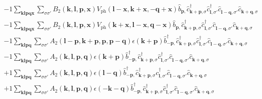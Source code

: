 \begin{align*}
	&-1 \sum_{ \mathbf{k} \mathbf{l} \mathbf{p} \mathbf{q} \mathbf{x} } \sum_{ \sigma \sigma' } B_2( \mathbf{k}, \mathbf{l}, \mathbf{p}, \mathbf{x} )  V_\mathrm{ph}( \mathbf{l}-\mathbf{x}, \mathbf{k}+\mathbf{x}, -\mathbf{q}+\mathbf{x} )   \hat{b}_{ \mathbf{p}, }^{\phantom{\dagger}} \hat{c}_{ \mathbf{k}+\mathbf{p}, \sigma }^\dagger  \hat{c}_{ \mathbf{l}, \sigma' }^\dagger  \hat{c}_{ \mathbf{l}-\mathbf{q}, \sigma' }^{\phantom{\dagger}} \hat{c}_{ \mathbf{k}+\mathbf{q}, \sigma }^{\phantom{\dagger}}  \\
	&-1 \sum_{ \mathbf{k} \mathbf{l} \mathbf{p} \mathbf{q} \mathbf{x} } \sum_{ \sigma \sigma' } B_2( \mathbf{k}, \mathbf{l}, \mathbf{p}, \mathbf{x} )  V_\mathrm{ph}( \mathbf{k}+\mathbf{x}, \mathbf{l}-\mathbf{x}, \mathbf{q}-\mathbf{x} )   \hat{b}_{ \mathbf{p}, }^{\phantom{\dagger}} \hat{c}_{ \mathbf{k}+\mathbf{p}, \sigma }^\dagger  \hat{c}_{ \mathbf{l}, \sigma' }^\dagger  \hat{c}_{ \mathbf{l}-\mathbf{q}, \sigma' }^{\phantom{\dagger}} \hat{c}_{ \mathbf{k}+\mathbf{q}, \sigma }^{\phantom{\dagger}}  \\
	&-1 \sum_{ \mathbf{k} \mathbf{l} \mathbf{p} \mathbf{q} } \sum_{ \sigma \sigma' } A_2( \mathbf{l}-\mathbf{p}, \mathbf{k}+\mathbf{p}, \mathbf{p}, \mathbf{p}-\mathbf{q} )  \epsilon( \mathbf{k}+\mathbf{p} )   \hat{b}_{ -\mathbf{p}, }^\dagger  \hat{c}_{ \mathbf{k}+\mathbf{p}, \sigma }^\dagger  \hat{c}_{ \mathbf{l}, \sigma' }^\dagger  \hat{c}_{ \mathbf{l}-\mathbf{q}, \sigma' }^{\phantom{\dagger}} \hat{c}_{ \mathbf{k}+\mathbf{q}, \sigma }^{\phantom{\dagger}}  \\
	&-1 \sum_{ \mathbf{k} \mathbf{l} \mathbf{p} \mathbf{q} } \sum_{ \sigma \sigma' } A_2( \mathbf{k}, \mathbf{l}, \mathbf{p}, \mathbf{q} )  \epsilon( \mathbf{k}+\mathbf{p} )   \hat{b}_{ -\mathbf{p}, }^\dagger  \hat{c}_{ \mathbf{k}+\mathbf{p}, \sigma }^\dagger  \hat{c}_{ \mathbf{l}, \sigma' }^\dagger  \hat{c}_{ \mathbf{l}-\mathbf{q}, \sigma' }^{\phantom{\dagger}} \hat{c}_{ \mathbf{k}+\mathbf{q}, \sigma }^{\phantom{\dagger}}  \\
	&+1 \sum_{ \mathbf{k} \mathbf{l} \mathbf{p} \mathbf{q} } \sum_{ \sigma \sigma' } A_2( \mathbf{k}, \mathbf{l}, \mathbf{p}, \mathbf{q} )  \epsilon( \mathbf{l}-\mathbf{q} )   \hat{b}_{ -\mathbf{p}, }^\dagger  \hat{c}_{ \mathbf{k}+\mathbf{p}, \sigma }^\dagger  \hat{c}_{ \mathbf{l}, \sigma' }^\dagger  \hat{c}_{ \mathbf{l}-\mathbf{q}, \sigma' }^{\phantom{\dagger}} \hat{c}_{ \mathbf{k}+\mathbf{q}, \sigma }^{\phantom{\dagger}}  \\
	&+1 \sum_{ \mathbf{k} \mathbf{l} \mathbf{p} \mathbf{q} } \sum_{ \sigma \sigma' } A_2( \mathbf{k}, \mathbf{l}, \mathbf{p}, \mathbf{q} )  \epsilon( -\mathbf{k}-\mathbf{q} )   \hat{b}_{ -\mathbf{p}, }^\dagger  \hat{c}_{ \mathbf{k}+\mathbf{p}, \sigma }^\dagger  \hat{c}_{ \mathbf{l}, \sigma' }^\dagger  \hat{c}_{ \mathbf{l}-\mathbf{q}, \sigma' }^{\phantom{\dagger}} \hat{c}_{ \mathbf{k}+\mathbf{q}, \sigma }^{\phantom{\dagger}}  \\

\end{align*}
